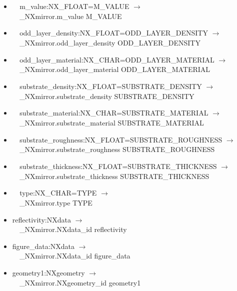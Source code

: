 \documentclass[11pt]{article}
\begin{document}
{{\begin{itemize}
\item{\verb|  |m\_value:NX\_FLOAT=M\_VALUE $\rightarrow$\\
\verb|  |\_NXmirror.m\_value M\_VALUE}

\item{\verb|  |odd\_layer\_density:NX\_FLOAT=ODD\_LAYER\_DENSITY $\rightarrow$\\
\verb|  |\_NXmirror.odd\_layer\_density ODD\_LAYER\_DENSITY}

\item{\verb|  |odd\_layer\_material:NX\_CHAR=ODD\_LAYER\_MATERIAL $\rightarrow$\\
\verb|  |\_NXmirror.odd\_layer\_material ODD\_LAYER\_MATERIAL}

\item{\verb|  |substrate\_density:NX\_FLOAT=SUBSTRATE\_DENSITY $\rightarrow$\\
\verb|  |\_NXmirror.substrate\_density SUBSTRATE\_DENSITY}

\item{\verb|  |substrate\_material:NX\_CHAR=SUBSTRATE\_MATERIAL $\rightarrow$\\
\verb|  |\_NXmirror.substrate\_material SUBSTRATE\_MATERIAL}

\item{\verb|  |substrate\_roughness:NX\_FLOAT=SUBSTRATE\_ROUGHNESS $\rightarrow$\\
\verb|  |\_NXmirror.substrate\_roughness SUBSTRATE\_ROUGHNESS}

\item{\verb|  |substrate\_thickness:NX\_FLOAT=SUBSTRATE\_THICKNESS $\rightarrow$\\
\verb|  |\_NXmirror.substrate\_thickness SUBSTRATE\_THICKNESS}

\item{\verb|  |type:NX\_CHAR=TYPE $\rightarrow$\\
\verb|  |\_NXmirror.type TYPE}

\item{reflectivity:NXdata $\rightarrow$\\
\verb|  |\_NXmirror.NXdata\_id reflectivity}

\item{figure\_data:NXdata $\rightarrow$\\
\verb|  |\_NXmirror.NXdata\_id figure\_data}

\item{geometry1:NXgeometry $\rightarrow$\\
\verb|  |\_NXmirror.NXgeometry\_id geometry1}


\end{itemize}}}
\end{document}
